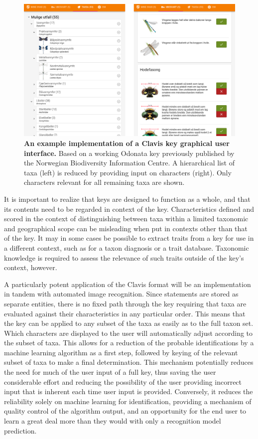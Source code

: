 \documentclass[10pt,letterpaper]{article}
\begin{document}
\begin{figure}[!h]
  \includegraphics[width=\textwidth]{Images/Fig5}
  \caption{{\bf An example implementation of a Clavis key graphical user interface.}
Based on a working Odonata key previously published by the Norwegian Biodiversity Information Centre. A hierarchical list of taxa (left) is reduced by providing input on characters (right). Only characters relevant for all remaining taxa are shown.
}
  \label{fig5}
\end{figure}

It is important to realize that keys are designed to function as a whole, and that its contents need to be regarded in context of the key. Characteristics defined and scored in the context of distinguishing between taxa within a limited taxonomic and geographical scope can be misleading when put in contexts other than that of the key. It may in some cases be possible to extract traits from a key for use in a different context, such as for a taxon diagnosis or a trait database. Taxonomic knowledge is required to assess the relevance of such traits outside of the key's context, however. 

A particularly potent application of the Clavis format will be an implementation in tandem with automated image recognition. Since statements are stored as separate entities, there is no fixed path through the key requiring that taxa are evaluated against their characteristics in any particular order. This means that the key can be applied to any subset of the taxa as easily as to the full taxon set. Which characters are displayed to the user will automatically adjust according to the subset of taxa. This allows for a reduction of the probable identifications by a machine learning algorithm as a first step, followed by keying of the relevant subset of taxa to make a final determination. This mechanism potentially reduces the need for much of the user input of a full key, thus saving the user considerable effort and reducing the possibility of the user providing incorrect input that is inherent each time user input is provided. Conversely, it reduces the reliability solely on machine learning for identification, providing a mechanism of quality control of the algorithm output, and an opportunity for the end user to learn a great deal more than they would with only a recognition model prediction.
\end{document}
